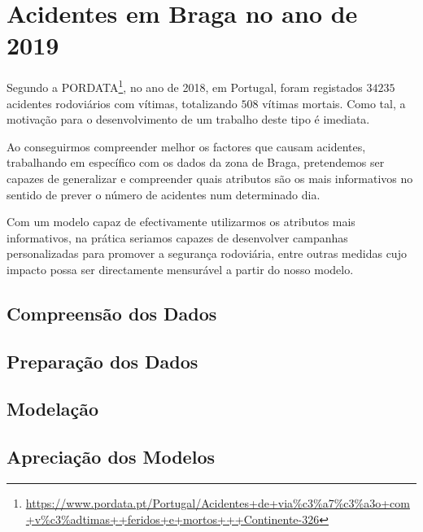 \section{Acidentes em Braga no ano de 2019}

Segundo a PORDATA\footnote{\url{https://www.pordata.pt/Portugal/Acidentes+de+via\%c3\%a7\%c3\%a3o+com+v\%c3\%adtimas++feridos+e+mortos+++Continente-326}}, no ano de 2018, em Portugal, foram registados $34235$ acidentes rodoviários com vítimas, totalizando $508$ vítimas mortais. Como tal, a motivação para o desenvolvimento de um trabalho deste tipo é imediata.

Ao conseguirmos compreender melhor os factores que causam acidentes, trabalhando em específico com os dados da zona de Braga, pretendemos ser capazes de generalizar e compreender quais atributos são os mais informativos no sentido de prever o número de acidentes num determinado dia.

Com um modelo capaz de efectivamente utilizarmos os atributos mais informativos, na prática seriamos capazes de desenvolver campanhas personalizadas para promover a segurança rodoviária, entre outras medidas cujo impacto possa ser directamente mensurável a partir do nosso modelo.

\subsection{Compreensão dos Dados}


\subsection{Preparação dos Dados}


\subsection{Modelação}


\subsection{Apreciação dos Modelos}
